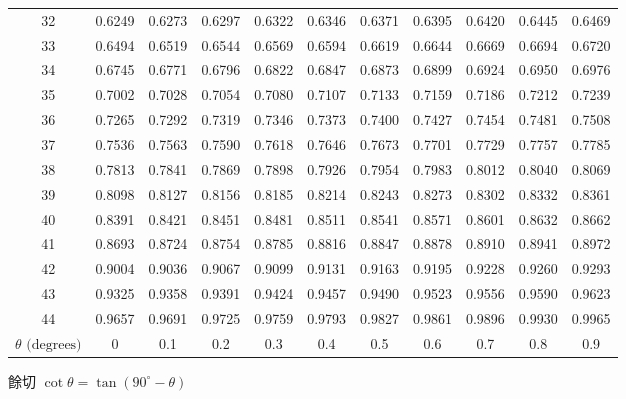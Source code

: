 {\begin{tabular}{|c|cccccccccc|}
32 & 0.6249 & 0.6273 & 0.6297 & 0.6322 & 0.6346 & 0.6371 & 0.6395 & 0.6420 & 0.6445 & 0.6469 \\
33 & 0.6494 & 0.6519 & 0.6544 & 0.6569 & 0.6594 & 0.6619 & 0.6644 & 0.6669 & 0.6694 & 0.6720 \\
34 & 0.6745 & 0.6771 & 0.6796 & 0.6822 & 0.6847 & 0.6873 & 0.6899 & 0.6924 & 0.6950 & 0.6976 \\
\hline
35 & 0.7002 & 0.7028 & 0.7054 & 0.7080 & 0.7107 & 0.7133 & 0.7159 & 0.7186 & 0.7212 & 0.7239 \\
36 & 0.7265 & 0.7292 & 0.7319 & 0.7346 & 0.7373 & 0.7400 & 0.7427 & 0.7454 & 0.7481 & 0.7508 \\
37 & 0.7536 & 0.7563 & 0.7590 & 0.7618 & 0.7646 & 0.7673 & 0.7701 & 0.7729 & 0.7757 & 0.7785 \\
38 & 0.7813 & 0.7841 & 0.7869 & 0.7898 & 0.7926 & 0.7954 & 0.7983 & 0.8012 & 0.8040 & 0.8069 \\
39 & 0.8098 & 0.8127 & 0.8156 & 0.8185 & 0.8214 & 0.8243 & 0.8273 & 0.8302 & 0.8332 & 0.8361 \\
\hline
40 & 0.8391 & 0.8421 & 0.8451 & 0.8481 & 0.8511 & 0.8541 & 0.8571 & 0.8601 & 0.8632 & 0.8662 \\
41 & 0.8693 & 0.8724 & 0.8754 & 0.8785 & 0.8816 & 0.8847 & 0.8878 & 0.8910 & 0.8941 & 0.8972 \\
42 & 0.9004 & 0.9036 & 0.9067 & 0.9099 & 0.9131 & 0.9163 & 0.9195 & 0.9228 & 0.9260 & 0.9293 \\
43 & 0.9325 & 0.9358 & 0.9391 & 0.9424 & 0.9457 & 0.9490 & 0.9523 & 0.9556 & 0.9590 & 0.9623 \\
44 & 0.9657 & 0.9691 & 0.9725 & 0.9759 & 0.9793 & 0.9827 & 0.9861 & 0.9896 & 0.9930 & 0.9965 \\
\hline
$\theta\text{ (degrees)}$ & 0 & 0.1 & 0.2 & 0.3 & 0.4 & 0.5 & 0.6 & 0.7 & 0.8 & 0.9 \\ \hline
\end{tabular}\par}
\vspace{0.5em}\begin{center}\small 餘切 $\cot\theta = \tan(90^\circ - \theta)$\end{center}
\clearpage

